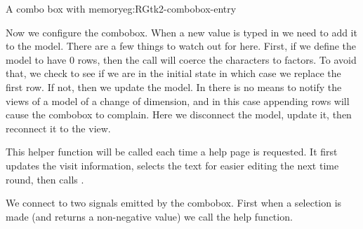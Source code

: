 \begin{example}{A combo box with memory}{eg:RGtk2-combobox-entry}


Now we configure the combobox. When a new value is typed in we need to
add it to the model. There are a few things to watch out for
here. First, if we define the model to have $0$ rows, then the
 call will coerce the characters to factors. To avoid
that, we check to see if we are in the initial state in which case we
replace the first row. If not, then we update the model. In \GTK\/
there is no means to notify the views of a model of a change of
dimension, and in this case appending rows will cause the combobox to
complain. Here we disconnect the model, update it, then reconnect it
to the view.
\begin{Schunk}
\end{Schunk}

This helper function will be called each time a help page is
requested. It first updates the visit information, selects the
text for easier editing the next time round, then calls  .
\begin{Schunk}
\end{Schunk}

We connect to two signals emitted by the combobox. First when a
selection is made (and   returns a
non-negative value) we call the help function.
\begin{Schunk}
\end{Schunk}


\end{example}
